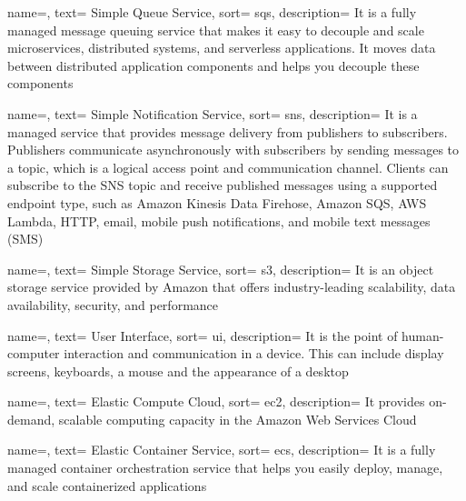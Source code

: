 {
  name=,
  text= Simple Queue Service,
  sort= sqs,
  description= {It is a fully managed message queuing service that makes it easy to decouple and scale microservices, distributed systems, and serverless applications. It moves data between distributed application components and helps you decouple these components}
}

{
  name=,
  text= Simple Notification Service,
  sort= sns,
  description= {It is a managed service that provides message delivery from publishers to subscribers. Publishers communicate asynchronously with subscribers by sending messages to a topic, which is a logical access point and communication channel. Clients can subscribe to the SNS topic and receive published messages using a supported endpoint type, such as Amazon Kinesis Data Firehose, Amazon SQS, AWS Lambda, HTTP, email, mobile push notifications, and mobile text messages (SMS)}
}

{
  name=,
  text= Simple Storage Service,
  sort= s3,
  description= {It is an object storage service provided by Amazon that offers industry-leading scalability, data availability, security, and performance}
}

{
  name=,
  text= User Interface,
  sort= ui,
  description= {It is the point of human-computer interaction and communication in a device. This can include display screens, keyboards, a mouse and the appearance of a desktop}
}

{
  name=,
  text= Elastic Compute Cloud,
  sort= ec2,
  description= {It provides on-demand, scalable computing capacity in the Amazon Web Services Cloud}
}

{
  name=,
  text= Elastic Container Service,
  sort= ecs,
  description= {It is a fully managed container orchestration service that helps you easily deploy, manage, and scale containerized applications}
}

